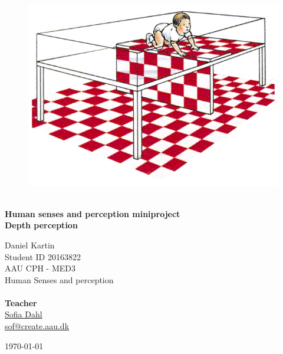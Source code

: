 \begin{titlepage}
			
\addtolength{\voffset}{2cm}

\begin{figure}[H]
\centering
\vspace{2cm}	%
\includegraphics[width=0.99\linewidth]{figure/Frontpage/frontpage.png}
\end{figure}

\mbox{}
\vfill
\renewcommand{\familydefault}{\sfdefault} \normalfont %
\HRule\\[0.2cm]
\textbf{{\small Human senses and perception miniproject\\ \Huge Depth perception}}\\
\HRule\medskip{}
\begin{multicols}{2}
{\Large Daniel Kartin\\Student ID 20163822\\\small AAU CPH - 
	MED3 \\
	Human Senses and perception\\\columnbreak}\\
\setlength{\parskip}{2.4cm}
\Large{\textbf{Teacher}\\\href{http://personprofil.aau.dk/118552?lang=en}{\color{blue}Sofia Dahl}\\ \href{mailto:sof@create.aau.dk}{sof@create.aau.dk}}
\end{multicols}
\today
\renewcommand{\familydefault}{\rmdefault} \normalfont %
\end{titlepage}


